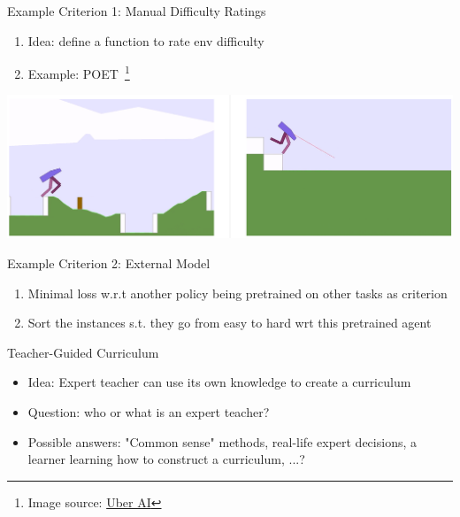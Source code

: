 \documentclass[aspectratio=169]{../latex_main/tntbeamer}  %
\begin{document}
\begin{frame}[c]{Example Criterion 1: Manual Difficulty Ratings}
	
	\begin{enumerate}
		\item Idea: define a function to rate env difficulty
		\item Example: POET~\footnote{Image source: \href{https://eng.uber.com/poet-open-ended-deep-learning/}{Uber AI}}
	\end{enumerate}
	\centering
	
	\includegraphics[scale=0.5]{images/t05/poet.PNG}			
\end{frame}

\begin{frame}[c]{Example Criterion 2: External Model}
	
	\begin{enumerate}
		\item Minimal loss w.r.t another policy being pretrained on other tasks as criterion
		\item Sort the instances s.t. they go from easy to hard wrt this pretrained agent~
	\end{enumerate}
	
\end{frame}

\begin{frame}[c]{Teacher-Guided Curriculum}
	
	\begin{itemize}
		\item Idea: Expert teacher can use its own knowledge to create a curriculum
		\item Question: who or what is an expert teacher?
		\pause
		\item Possible answers: "Common sense" methods, real-life expert decisions, a learner learning how to construct a curriculum, ...?
	\end{itemize}
	
\end{frame}
\end{document}
